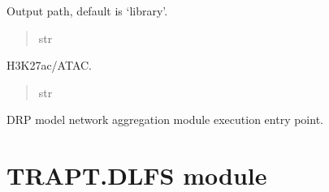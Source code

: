 \documentclass[letterpaper,10pt,english]{sphinxmanual}
\begin{document}
\begin{fulllineitems}
\begin{fulllineitems}
\label{\detokenize{index:TRAPT.CalcTRSampleRPMatrix.CalcTRSampleRPMatrix.output}}
\pysigstartsignatures
{}
\pysigstopsignatures
\sphinxAtStartPar
Output path, default is ‘library’.
\begin{quote}\begin{description}
\sphinxAtStartPar
str

\end{description}\end{quote}

\end{fulllineitems}


\begin{fulllineitems}
\label{\detokenize{index:TRAPT.CalcTRSampleRPMatrix.CalcTRSampleRPMatrix.type}}
\pysigstartsignatures
{}
\pysigstopsignatures
\sphinxAtStartPar
H3K27ac/ATAC.
\begin{quote}\begin{description}
\sphinxAtStartPar
str

\end{description}\end{quote}

\end{fulllineitems}


\begin{fulllineitems}
\label{\detokenize{index:TRAPT.CalcTRSampleRPMatrix.CalcTRSampleRPMatrix.run}}
\pysigstartsignatures
{}
\pysigstopsignatures
\sphinxAtStartPar
D\sphinxhyphen{}RP model network aggregation module execution entry point.

\end{fulllineitems}


\end{fulllineitems}



\chapter{TRAPT.DLFS module}
\label{\detokenize{index:module-TRAPT.DLFS}}\label{\detokenize{index:trapt-dlfs-module}}
\end{document}
